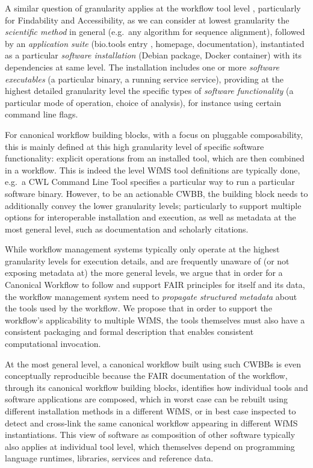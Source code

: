 A similar question of granularity applies at the workflow tool level
\cite{ch6-4}, particularly for Findability and Accessibility, as we can
consider at lowest granularity the \emph{scientific method} in general
(e.g.~any algorithm for sequence alignment), followed by an
\emph{application suite} (bio.tools entry \cite{ch6-35}, homepage,
documentation), instantiated as a particular \emph{software
installation} (Debian package, Docker container) with its dependencies
at same level. The installation includes one or more \emph{software
executables} (a particular binary, a running service service), providing
at the highest detailed granularity level the specific types of
\emph{software functionality} (a particular mode of operation, choice of
analysis), for instance using certain command line flags.

For canonical workflow building blocks, with a focus on pluggable
composability, this is mainly defined at this high granularity level of
specific software functionality: explicit operations from an installed
tool, which are then combined in a workflow. This is indeed the level
WfMS tool definitions are typically done, e.g.~a CWL Command Line Tool
specifies a particular way to run a particular software binary. However,
to be an actionable CWBB, the building block needs to additionally
convey the lower granularity levels; particularly to support multiple
options for interoperable installation and execution, as well as
metadata at the most general level, such as documentation and scholarly
citations.

While workflow management systems typically only operate at the highest
granularity levels for execution details, and are frequently unaware of
(or not exposing metadata at) the more general levels, we argue that in
order for a Canonical Workflow \cite{ch6-36} to follow and support FAIR
principles for itself and its data, the workflow management system need
to \emph{propagate structured metadata} about the tools used by the
workflow. We propose that in order to support the workflow's
applicability to multiple WfMS, the tools themselves must also have a
consistent packaging and formal description that enables consistent
computational invocation.

At the most general level, a canonical workflow built using such CWBBs
is even conceptually reproducible because the FAIR documentation of the
workflow, through its canonical workflow building blocks, identifies how
individual tools and software applications are composed, which in worst
case can be rebuilt using different installation methods in a different
WfMS, or in best case inspected to detect and cross-link the same
canonical workflow appearing in different WfMS instantiations. This view
of software as composition of other software typically also applies at
individual tool level, which themselves depend on programming language
runtimes, libraries, services and reference data.

